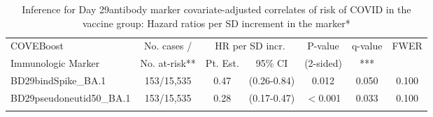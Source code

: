 \begin{longtable}{lcccccc}
\caption{Inference for Day 29antibody marker covariate-adjusted correlates of risk of COVID in the vaccine group: Hazard ratios per SD increment in the marker*} \\ 
   \hline
 
         \multicolumn{1}{l}{COVEBoost} & \multicolumn{1}{c}{No. cases /}   & \multicolumn{2}{c}{HR per SD incr.}                     & \multicolumn{1}{c}{P-value}   & \multicolumn{1}{c}{q-value}   & \multicolumn{1}{c}{FWER} \\ 
         \multicolumn{1}{l}{Immunologic Marker}            & \multicolumn{1}{c}{No. at-risk**} & \multicolumn{1}{c}{Pt. Est.} & \multicolumn{1}{c}{95\% CI} & \multicolumn{1}{c}{(2-sided)} & \multicolumn{1}{c}{***} & \multicolumn{1}{c}{} \\ 
         \hline
 
    BD29bindSpike\_BA.1 & 153/15,535 & 0.47 & (0.26-0.84) & 0.012 & 0.050 & 0.100 \\ 
  BD29pseudoneutid50\_BA.1 & 153/15,535 & 0.28 & (0.17-0.47) & $<$0.001 & 0.033 & 0.100 \\ 
   \hline
\hline
\label{tab:CoR_univariable_svycoxph_pretty_scaled}
\end{longtable}
